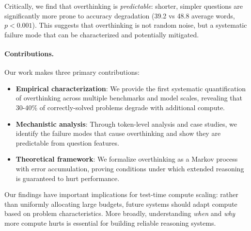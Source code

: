 Critically, we find that overthinking is \emph{predictable}: shorter, simpler questions are significantly more prone to accuracy degradation (39.2 vs 48.8 average words, $p < 0.001$).
This suggests that overthinking is not random noise, but a systematic failure mode that can be characterized and potentially mitigated.

\paragraph{Contributions.}
Our work makes three primary contributions:
\begin{itemize}[leftmargin=*,nosep]
    \item \textbf{Empirical characterization}: We provide the first systematic quantification of overthinking across multiple benchmarks and model scales, revealing that 30-40\% of correctly-solved problems degrade with additional compute.

    \item \textbf{Mechanistic analysis}: Through token-level analysis and case studies, we identify the failure modes that cause overthinking and show they are predictable from question features.

    \item \textbf{Theoretical framework}: We formalize overthinking as a Markov process with error accumulation, proving conditions under which extended reasoning is guaranteed to hurt performance.
\end{itemize}

Our findings have important implications for test-time compute scaling: rather than uniformly allocating large budgets, future systems should adapt compute based on problem characteristics.
More broadly, understanding \emph{when} and \emph{why} more compute hurts is essential for building reliable reasoning systems.
